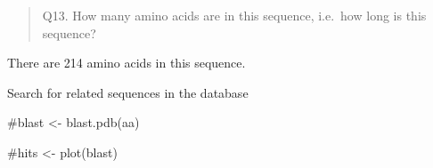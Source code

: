\documentclass[
  letterpaper,
  DIV=11,
  numbers=noendperiod]{scrartcl}
\newenvironment{Shaded}{\begin{snugshade}}{\end{snugshade}}
\newcommand{\CommentTok}[1]{\textcolor[rgb]{0.37,0.37,0.37}{#1}}
\newcommand{\ConstantTok}[1]{\textcolor[rgb]{0.56,0.35,0.01}{#1}}
\newcommand{\FunctionTok}[1]{\textcolor[rgb]{0.28,0.35,0.67}{#1}}
\newcommand{\NormalTok}[1]{\textcolor[rgb]{0.00,0.23,0.31}{#1}}
\newcommand{\OtherTok}[1]{\textcolor[rgb]{0.00,0.23,0.31}{#1}}
\newcommand{\SpecialCharTok}[1]{\textcolor[rgb]{0.37,0.37,0.37}{#1}}
\newcommand{\StringTok}[1]{\textcolor[rgb]{0.13,0.47,0.30}{#1}}
\begin{document}
\begin{quote}
Q13. How many amino acids are in this sequence, i.e.~how long is this
sequence?
\end{quote}

There are 214 amino acids in this sequence.

Search for related sequences in the database

\begin{Shaded}
\begin{Highlighting}[]
\CommentTok{\#blast \textless{}{-} blast.pdb(aa)}
\end{Highlighting}
\end{Shaded}

\begin{Shaded}
\end{Shaded}

\begin{Shaded}
\begin{Highlighting}[]
\CommentTok{\#hits \textless{}{-} plot(blast)}
\end{Highlighting}
\end{Shaded}

\begin{Shaded}
\end{Shaded}
\end{document}
